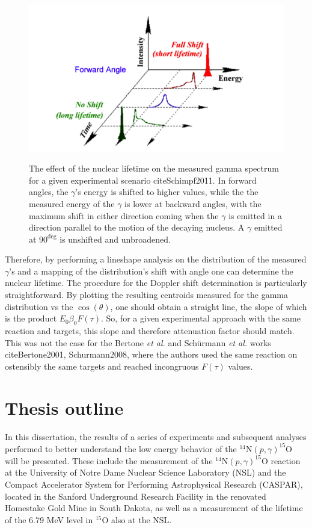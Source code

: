 \begin{figure}
\includegraphics[width=\linewidth]{figures/dopplerEffects.png}
\label{fig: dopplerShift}
\caption{The effect of the nuclear lifetime on the measured gamma spectrum for a given experimental scenario cite{Schimpf2011}. In forward angles, the $\gamma$'s energy is shifted to higher values, while the the measured energy of the $\gamma$ is lower at backward angles, with the maximum shift in either direction coming when the $\gamma$ is emitted in a direction parallel to the motion of the decaying nucleus. A $\gamma$ emitted at $90^{\deg}$ is unshifted and unbroadened. }
\end{figure}

Therefore, by performing a lineshape analysis on the distribution of the measured $\gamma$'s and a mapping of the distribution's shift with angle one can determine the nuclear lifetime. The procedure for the Doppler shift determination is particularly straightforward. By plotting the resulting centroids measured for the gamma distribution vs the $\cos(\theta)$, one should obtain a straight line, the slope of which is the product $E_{0} \beta_{0} F(\tau)$. So, for a given experimental approach with the same reaction and targets, this slope and therefore attenuation factor should match. This was not the case for the Bertone \textit{et al.} and Sch{\"u}rmann \textit{et al.} works cite{Bertone2001, Schurmann2008}, where the authors used the same reaction on ostensibly the same targets and reached incongruous $F(\tau)$ values. 
 

\section{Thesis outline}
\label{sec: thesis outline}

In this dissertation, the results of a series of experiments and subsequent analyses performed to better understand the low energy behavior of the $^{14}$N$\left( p,\gamma \right) ^{15}$O will be presented. These include the measurement of the $^{14}$N$\left( p,\gamma \right) ^{15}$O reaction at the University of Notre Dame Nuclear Science Laboratory (NSL) and the Compact Accelerator System for Performing Astrophysical Research (CASPAR), located in the Sanford Underground Research Facility in the renovated Homestake Gold Mine in South Dakota, as well as a measurement of the lifetime of the 6.79 MeV level in $^{15}$O also at the NSL. 

